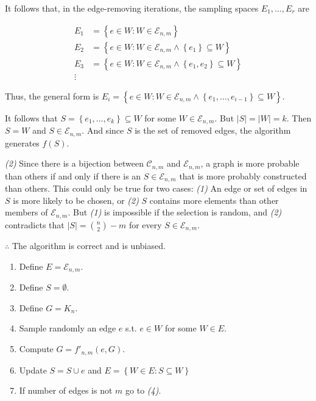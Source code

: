 \documentclass[a4paper, 12pt]{article}
\begin{document}
It follows that, in the edge-removing iterations, the sampling spaces $E_1,
\ldots, E_r$ are

\begin{align*}
    E_1 &= \left\{ e \in W : W \in \mathcal{E}_{n,m}  \right\}  \\ 
    E_2 &= \left\{ e \in W : W \in \mathcal{E}_{n,m} \land \left\{ e_1 \right\}  \subseteq  W  \right\} \\ 
    E_3 &= \left\{ e \in W : W \in \mathcal{E}_{n,m} \land \left\{ e_1, e_2 \right\}  \subseteq  W  \right\} \\ 
    \vdots 
\end{align*}

Thus, the general form is $E_i = \left\{ e \in W : W \in \mathcal{E}_{n,m} \land \left\{ e_1, \ldots, e_{i-1} \right\} \subseteq W \right\} $.

It follows that $S = \left\{ e_1, \ldots, e_k \right\} \subseteq W$ for some $W
\in \mathcal{E}_{n,m}$. But $|S| = |W| = k$. Then $S = W$ and $S \in
\mathcal{E}_{n,m}$. And since $S$ is the set of removed edges, the algorithm
generates $f(S)$.

\textit{(2)} Since there is a bijection between $\mathcal{C}_{n,m}$ and
$\mathcal{E}_{n,m}$, a graph is more probable than others if and only if there
is an $S \in \mathcal{E}_{n,m}$ that is more probably constructed than others.
This could only be true for two cases: \textit{(1)} An edge or set of edges in
$S$ is more likely to be chosen, or \textit{(2)} $S$ contains more elements
than other members of $\mathcal{E}_{n,m}$. But \textit{(1)} is impossible if
the selection is random, and \textit{(2)} contradicts that $|S| = \binom{n}{2}
- m$ for every $S \in \mathcal{E}_{n,m}$.

$\therefore $ The algorithm is correct and is unbiased.



\pagebreak
\begin{enumerate}
    \item Define $E = \mathcal{E}_{n, m}$.
    \item Define $S = \emptyset$.
    \item Define $G = K_n$.
    \item Sample randomly an edge $e$ s.t. $e \in W$ for some $W \in E$. 
    \item Compute $G = f'_{n,m}(e, G)$. 
    \item Update $S = S \cup e $ and $E = \left\{ W \in E : S \subseteq W \right\} $
    \item If number of edges is not $m$ go to \textit{(4)}.
\end{enumerate}
\end{document}
